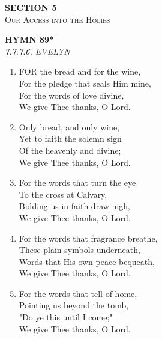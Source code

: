 \newpage
\thispagestyle{empty}
\vspace*{3.5cm}
\begin{center}
    {\LARGE \textbf{SECTION 5}}\\[0.8em]
    {\Large \textsc{Our Access into the Holies}}
\end{center}
\vspace{3.5cm}

\newpage
\begin{center}
    {\Large \textbf{HYMN 89*\textdagger{}}}
    \\
    \textit{7.7.7.6. EVELYN}
\end{center}
\vspace{1em}

\begin{enumerate}
    \item FOR the bread and for the wine, \\
        For the pledge that seals Him mine, \\
        For the words of love divine, \\
        We give Thee thanks, O Lord.

    \item Only bread, and only wine, \\
        Yet to faith the solemn sign \\
        Of the heavenly and divine; \\
        We give Thee thanks, O Lord.

    \item For the words that turn the eye \\
        To the cross at Calvary, \\
        Bidding us in faith draw nigh, \\
        We give Thee thanks, O Lord.

    \item For the words that fragrance breathe, \\
        These plain symbols underneath, \\
        Words that His own peace bequeath, \\
        We give Thee thanks, O Lord.

    \item For the words that tell of home, \\
        Pointing us beyond the tomb, \\
        "Do ye this until I come;" \\
        We give Thee thanks, O Lord.


\end{enumerate}
